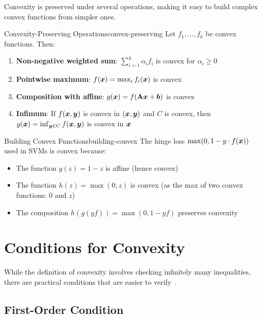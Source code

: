 \documentclass[../../main.tex]{subfiles}
\begin{document}
Convexity is preserved under several operations, making it easy to build complex convex functions from simpler ones.

\begin{theorem}{Convexity-Preserving Operations}{convex-preserving}
Let $f_1, \ldots, f_k$ be convex functions. Then:
\begin{enumerate}
    \item \textbf{Non-negative weighted sum}: $\sum_{i=1}^k \alpha_i f_i$ is convex for $\alpha_i \geq 0$
    \item \textbf{Pointwise maximum}: $f(\boldsymbol{x}) = \max_i f_i(\boldsymbol{x})$ is convex
    \item \textbf{Composition with affine}: $g(\boldsymbol{x}) = f(\mathbf{A}\boldsymbol{x} + \boldsymbol{b})$ is convex
    \item \textbf{Infimum}: If $f(\boldsymbol{x}, \boldsymbol{y})$ is convex in $(\boldsymbol{x}, \boldsymbol{y})$ and $C$ is convex, then $g(\boldsymbol{x}) = \inf_{\boldsymbol{y} \in C} f(\boldsymbol{x}, \boldsymbol{y})$ is convex in $\boldsymbol{x}$
\end{enumerate}
\end{theorem}

\begin{example}{Building Convex Functions}{building-convex}
The hinge loss $\max(0, 1 - y \cdot f(\boldsymbol{x}))$ used in SVMs is convex because:
\begin{itemize}
    \item The function $g(z) = 1 - z$ is affine (hence convex)
    \item The function $h(z) = \max(0, z)$ is convex (as the max of two convex functions: $0$ and $z$)
    \item The composition $h(g(yf)) = \max(0, 1 - yf)$ preserves convexity
\end{itemize}
\end{example}

\section{Conditions for Convexity}
\label{sec:convexity-conditions}

While the definition of convexity involves checking infinitely many inequalities, there are practical conditions that are easier to verify~\cite{boyd2004convex}.

\subsection{First-Order Condition}
\end{document}
